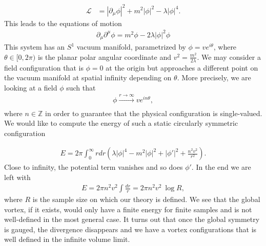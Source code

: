         \begin{align}
            \mathcal{L} &=  \left|\partial_{\mu} \phi \right|^2 + m^2 | \phi |^2 - \lambda |\phi|^4.
        \end{align}
    This leads to the equations of motion
    \begin{align}
        \partial_{\mu} \partial^{\mu} \phi = m^2 \phi - 2\lambda |\phi|^2 \phi
    \end{align}
    This system has an $S^1$ vacuum manifold, parametrized by $\phi = v e^{i \theta}$, where $\theta \in [0,2\pi)$ is the planar polar angular coordinate and $v^2 = \frac{m^2}{2 \lambda}$. We may consider a field configuration that is $\phi=0$ at the origin but approaches a different point on the vacuum manifold at spatial infinity depending on $\theta$. More precisely, we are looking at a field $\phi$ such that
    \begin{align}
        \phi \xrightarrow[]{r\rightarrow \infty} v e^{i n\theta},
    \end{align}
    where $n \in \mathbb{Z}$ in order to guarantee that the physical configuration is single-valued.
    We would like to compute the energy of such a static circularly symmetric configuration

    \begin{align}
        E= 2 \pi \int_0^{\infty} r dr \left(\lambda |\phi|^4 - m^2 |\phi|^2 + |\phi'|^2 + \frac{n^2 v^2}{r^2} \right).
    \end{align}
    Close to infinity, the potential term vanishes and so does $\phi'$. In the end we are left with
    \begin{align}
        E = 2\pi n^2 v^2 \int \frac{dr}{r} =  2\pi n^2 v^2  \ \log R,
    \end{align}
    where $R$ is the sample size on which our theory is defined. We see that the global vortex, if it exists, would only have a finite energy for finite samples and is not well-defined in the most general case. It turns out that once the global symmetry is gauged, the divergence disappears and we have a vortex configurations that is well defined in the infinite volume limit.

